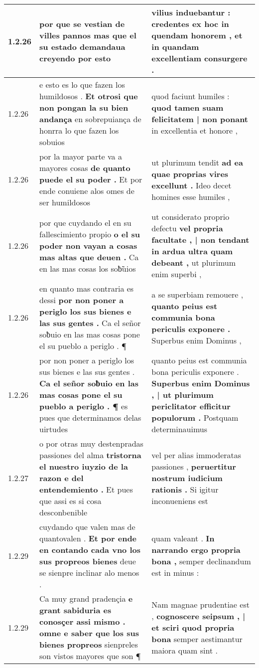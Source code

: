 \begin{tabular}{|p{1cm}|p{6.5cm}|p{6.5cm}|}
1.2.26 & por que se vestian de villes pannos \textbf{ mas que el su estado demandaua creyendo } por esto & vilius induebantur : \textbf{ credentes ex hoc in quendam honorem , } et in quandam excellentiam consurgere . \\\hline
1.2.26 & e esto es lo que fazen los humildosos . \textbf{ Et otrosi que non pongan la su bien andança } en sobrepuiança de honrra lo que fazen los sobuios & quod faciunt humiles : \textbf{ quod tamen suam felicitatem | non ponant } in excellentia et honore , \\\hline
1.2.26 & por la mayor parte va a mayores cosas \textbf{ de quanto puede el su poder . } Et por ende conuiene alos omes de ser humildosos & ut plurimum tendit \textbf{ ad ea quae proprias vires excellunt . } Ideo decet homines esse humiles , \\\hline
1.2.26 & por que cuydando el en su fallescimiento propio \textbf{ o el su poder non vayan a cosas mas altas que deuen . } Ca en las mas cosas los soƀ̃uios & ut considerato proprio defectu \textbf{ vel propria facultate , | non tendant in ardua ultra quam debeant , } ut plurimum enim superbi , \\\hline
1.2.26 & en quanto mas contraria es dessi \textbf{ por non poner a periglo los sus bienes e las sus gentes . } Ca el señor soƀuio en las mas cosas pone el su pueblo a periglo . ¶ & a se superbiam remouere , \textbf{ quanto peius est communia bona periculis exponere . } Superbus enim Dominus , \\\hline
1.2.26 & por non poner a periglo los sus bienes e las sus gentes . \textbf{ Ca el señor soƀuio en las mas cosas pone el su pueblo a periglo . ¶ } es pues que determinamos delas uirtudes & quanto peius est communia bona periculis exponere . \textbf{ Superbus enim Dominus , | ut plurimum periclitator efficitur populorum . } Postquam determinauimus \\\hline
1.2.27 & o por otras muy destenpradas passiones del alma \textbf{ tristorna el nuestro iuyzio de la razon e del entendemiento . } Et pues que assi es si cosa desconbenible & vel per alias immoderatas passiones , \textbf{ peruertitur nostrum iudicium rationis . } Si igitur inconueniens est \\\hline
1.2.29 & cuydando que valen mas de quantovalen . \textbf{ Et por ende en contando cada vno los sus propreos bienes } deue se sienpre inclinar alo menos . & quam valeant . \textbf{ In narrando ergo propria bona , } semper declinandum est in minus : \\\hline
1.2.29 & Ca muy grand pradençia \textbf{ e grant sabiduria es conosçer assi mismo . omne e saber que los sus bienes propreos } sienpreles son vistos mayores que son ¶ & Nam magnae prudentiae est , \textbf{ cognoscere seipsum , | et sciri quod propria bona } semper aestimantur maiora quam sint . \\\hline

\end{tabular}
